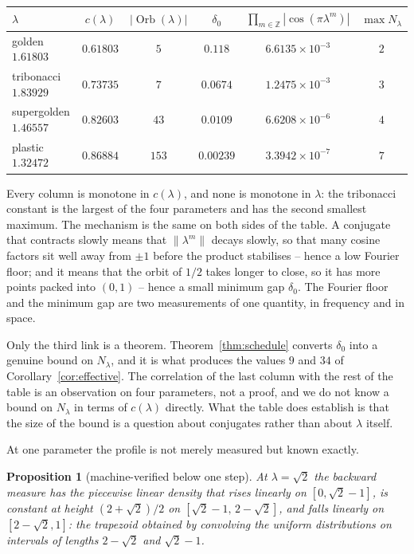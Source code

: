 \documentclass[11pt,reqno]{amsart}
\theoremstyle{plain}
\newtheorem{proposition}[theorem]{Proposition}
\theoremstyle{definition}
\theoremstyle{remark}
\newcommand{\Z}{\mathbb{Z}}
\DeclareMathOperator{\Orb}{Orb}
\begin{document}
\begin{center}
\begin{tabular}{lccccc}
\toprule
$\lambda$ & $c(\lambda)$ & $|\Orb(\lambda)|$ & $\delta_0$ &
$\prod_{m\in\Z}|\cos(\pi\lambda^m)|$ & $\max N_\lambda$\\
\midrule
golden $1.61803$ & $0.61803$ & $5$ & $0.118$ & $6.6135\times10^{-3}$ & $2$\\
tribonacci $1.83929$ & $0.73735$ & $7$ & $0.0674$ & $1.2475\times10^{-3}$ & $3$\\
supergolden $1.46557$ & $0.82603$ & $43$ & $0.0109$ & $6.6208\times10^{-6}$ & $4$\\
plastic $1.32472$ & $0.86884$ & $153$ & $0.00239$ & $3.3942\times10^{-7}$ & $7$\\
\bottomrule
\end{tabular}
\end{center}

Every column is monotone in $c(\lambda)$, and none is monotone in $\lambda$:
the tribonacci constant is the largest of the four parameters and has the
second smallest maximum. The mechanism is the same on both sides of the table.
A conjugate that contracts slowly means that $\|\lambda^m\|$ decays slowly, so
that many cosine factors sit well away from $\pm1$ before the product
stabilises -- hence a low Fourier floor; and it means that the orbit of $1/2$
takes longer to close, so it has more points packed into $(0,1)$ -- hence a
small minimum gap $\delta_0$. The Fourier floor and the minimum gap are two
measurements of one quantity, in frequency and in space.

Only the third link is a theorem. Theorem~\ref{thm:schedule} converts
$\delta_0$ into a genuine bound on $N_\lambda$, and it is what produces the
values $9$ and $34$ of Corollary~\ref{cor:effective}. The correlation of the
last column with the rest of the table is an observation on four parameters,
not a proof, and we do not know a bound on $N_\lambda$ in terms of
$c(\lambda)$ directly. What the table does establish is that the size of the
bound is a question about conjugates rather than about $\lambda$ itself.

At one parameter the profile is not merely measured but known exactly.

\begin{proposition}[machine-verified below one step]\label{prop:trapezoid}
At $\lambda=\sqrt2$ the backward measure has the piecewise linear density
that rises linearly on $[0,\sqrt2-1]$, is constant at height $(2+\sqrt2)/2$ on
$[\sqrt2-1,\,2-\sqrt2]$, and falls linearly on $[2-\sqrt2,1]$: the trapezoid
obtained by convolving the uniform distributions on intervals of lengths
$2-\sqrt2$ and $\sqrt2-1$.
\end{proposition}
\end{document}
